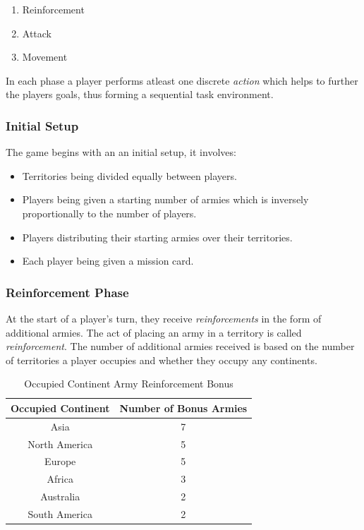 \documentclass[parskip]{cs4rep}
\begin{document}
\begin{enumerate}
\item
Reinforcement
\item
Attack
\item
Movement
\newline
\end{enumerate}

In each phase a player performs atleast one discrete \textit{action} which helps to further the players goals, thus forming a sequential task environment.

\subsubsection{Initial Setup}

The game begins with an an initial setup, it involves:

\begin{itemize}
\item
Territories being divided equally between players.
\item
Players being given a starting number of armies which is inversely proportionally to the number of players.
\item
Players distributing their starting armies over their territories.
\item
Each player being given a mission card.
\end{itemize}

\subsubsection{Reinforcement Phase}

At the start of a player's turn, they receive \textit{reinforcements} in the form of additional armies. The act of placing an army in a territory is called \textit{reinforcement}.  The number of additional armies received is based on the number of territories a player occupies and whether they occupy any continents.
\newline

\begin{table}[ht]
\centering
\begin{tabular}{|c|c|}
\hline 
\textbf{Occupied Continent} & \textbf{Number of Bonus Armies} \\ 
\hline 
Asia & 7 \\ 
\hline 
North America & 5 \\ 
\hline 
Europe & 5 \\ 
\hline 
Africa & 3 \\
\hline
Australia & 2 \\
\hline  
South America & 2 \\
\hline 
\end{tabular}
\caption{Occupied Continent Army Reinforcement Bonus}
\label{table:continent-bonus}
\end{table}
\end{document}
